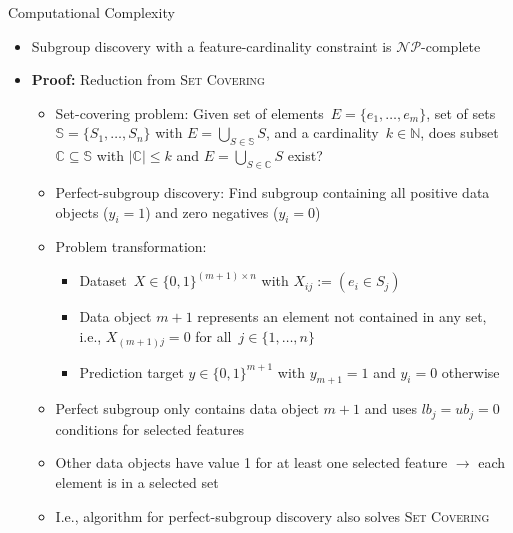 \documentclass[en, navbaroff, handout]{sdqbeamer}
\begin{document}
\begin{frame}[t]{Computational Complexity}
	\begin{itemize}
		\item Subgroup discovery with a feature-cardinality constraint is $\mathcal{NP}$-complete
		\vspace{\baselineskip}
		\item \textbf{Proof:} Reduction from \textsc{Set Covering}~\cite{karp1972reducibility}
		\begin{itemize}
			\item Set-covering problem: Given set of elements~$E = \{e_1, \dots, e_m\}$, set of sets~$\mathbb{S} = \{S_1,  \dots, S_n\}$ with $E = \bigcup_{S \in \mathbb{S}} S$, and a cardinality~$k \in \mathbb{N}$, does subset $\mathbb{C} \subseteq \mathbb{S}$ with $|\mathbb{C}| \leq k$ and $E = \bigcup_{S \in \mathbb{C}} S$ exist?
			\item Perfect-subgroup discovery: Find subgroup containing all positive data objects ($y_i = 1$) and zero negatives ($y_i = 0$)
			\item Problem transformation:
			\begin{itemize}
				\item Dataset~$X \in \{0, 1\}^{(m + 1) \times n}$ with $X_{ij} := (e_i \in S_j)$
				\item Data object $m+1$ represents an element not contained in any set, i.e., $X_{(m+1)j} = 0$ for all~$j \in \{1, \dots, n\}$
				\item Prediction target $y \in \{0, 1\}^{m+1}$ with $y_{m+1} = 1$ and $y_i = 0$ otherwise
			\end{itemize}
			\item Perfect subgroup only contains data object $m+1$ and uses $\mathit{lb}_j = \mathit{ub}_j = 0$ conditions for selected features
			\item Other data objects have value 1 for at least one selected feature $\rightarrow$ each element is in a selected set
			\item I.e., algorithm for perfect-subgroup discovery also solves \textsc{Set Covering}

\end{itemize}
\end{itemize}
\end{frame}
\end{document}
